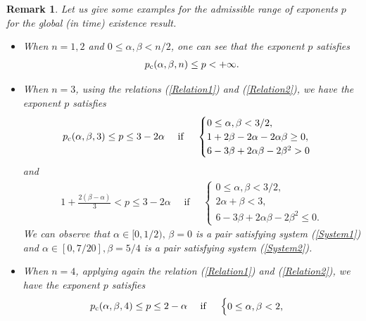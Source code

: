 \documentclass[11pt,reqno]{amsart}
\newtheorem{remark}{Remark}[section]
\begin{document}
 \begin{remark}
\selectfont
        Let us give some examples for the admissible range of exponents $p$ for the global (in time) existence result.
        \begin{itemize}[leftmargin=*]
            \item When $n = 1,2$ and $0 \leq \alpha, \beta < n/2$, one can see that the exponent $p$ satisfies
            \begin{align*}
               p_{\rm c}(\alpha,\beta,n) \leq p < +\infty.
            \end{align*}
         \item When $n = 3$, using the relations (\ref{Relation1}) and (\ref{Relation2}), we have the exponent $p$ satisfies
            \begin{align}
               p_{\rm c}(\alpha,\beta,3) \leq p \leq 3-2\alpha 
                \quad\text{ if }\quad 
               \begin{cases}
               0 \leq \alpha, \beta < 3/2 ,\\
               1+2\beta-2\alpha-2\alpha\beta \geq 0,\\
               6-3\beta+2\alpha\beta-2\beta^2 > 0
           \end{cases}\label{System1}
            \end{align}
        and 
        \begin{align}
            1+\frac{2(\beta-\alpha)}{3} < p \leq 3-2\alpha  \quad\text{ if }\quad 
               \begin{cases}
               0 \leq \alpha, \beta < 3/2 ,\\
               2\alpha+\beta < 3,\\
               6-3\beta+2\alpha\beta-2\beta^2 \leq 0.
           \end{cases} \label{System2}
        \end{align}
        We can observe that $\alpha \in [0, 1/2), \, \beta = 0$ is a pair satisfying system (\ref{System1}) and $\alpha \in [0, 7/20], \beta = 5/4 $ is a pair satisfying system (\ref{System2}).
        \item When $n=4$, applying again the relation (\ref{Relation1}) and (\ref{Relation2}), we have the exponent $p$ satisfies
        \begin{align}
               p_{\rm c}(\alpha,\beta,4) \leq p \leq 2-\alpha 
                \quad\text{ if }\quad 
               \begin{cases}
               0 \leq \alpha, \beta < 2 ,\\

\end{cases}
\end{align}
\end{itemize}
\end{remark}
\end{document}
